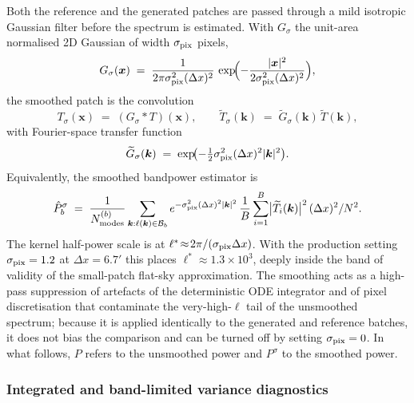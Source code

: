 \documentclass[11pt]{article}
\theoremstyle{definition}
\begin{document}
Both the reference and the generated patches are passed through a mild isotropic Gaussian filter before the spectrum is estimated. With $G_{\sigma}$ the unit-area normalised 2D Gaussian of width $\sigma_{\rm pix}$ pixels,
\begin{equation}
  G_{\sigma}(\bm x)\;=\;\frac{1}{2\pi\sigma_{\rm pix}^2(\Delta x)^2}\,
  \exp\!\Bigl(-\frac{|\bm x|^2}{2\sigma_{\rm pix}^2(\Delta x)^2}\Bigr),
\end{equation}
the smoothed patch is the convolution
\begin{equation}
  T_\sigma(\bm x)\;=\;(G_\sigma\!\ast\!T)(\bm x),
  \qquad
  \widetilde T_\sigma(\bm k)\;=\;\widetilde G_\sigma(\bm k)\,\widetilde T(\bm k),
\end{equation}
with Fourier-space transfer function
\begin{equation}
  \widetilde G_\sigma(\bm k)
  \;=\;\exp\!\bigl(-\tfrac12\sigma_{\rm pix}^2(\Delta x)^2|\bm k|^2\bigr).
\end{equation}
Equivalently, the smoothed bandpower estimator is
\begin{equation}
  \hat P_b^{\sigma}\;=\;
  \frac{1}{N^{(b)}_{\rm modes}}
  \sum_{\bm k:\ell(\bm k)\in\mathcal B_b}
  e^{-\sigma_{\rm pix}^2(\Delta x)^2|\bm k|^2}\,
  \frac{1}{B}\sum_{i=1}^B
  \bigl|\widetilde T_i(\bm k)\bigr|^2\,(\Delta x)^2/N^2.
  \label{eq:smoothed_bandpower}
\end{equation}
The kernel half-power scale is at $\ell^*\!\approx\!2\pi/(\sigma_{\rm pix}\Delta x)$. With the production setting $\sigma_{\rm pix}=1.2$ at $\Delta x=6.7'$ this places $\ell^*\!\approx\!1.3\!\times\!10^3$, deeply inside the band of validity of the small-patch flat-sky approximation. The smoothing acts as a high-pass suppression of artefacts of the deterministic ODE integrator and of pixel discretisation that contaminate the very-high-$\ell$ tail of the unsmoothed spectrum; because it is applied identically to the generated and reference batches, it does not bias the comparison and can be turned off by setting $\sigma_{\rm pix}=0$. In what follows, $P$ refers to the unsmoothed power and $P^{\sigma}$ to the smoothed power.

\subsubsection{Integrated and band-limited variance diagnostics}
\label{sec:fm_diag_variance}
\end{document}

